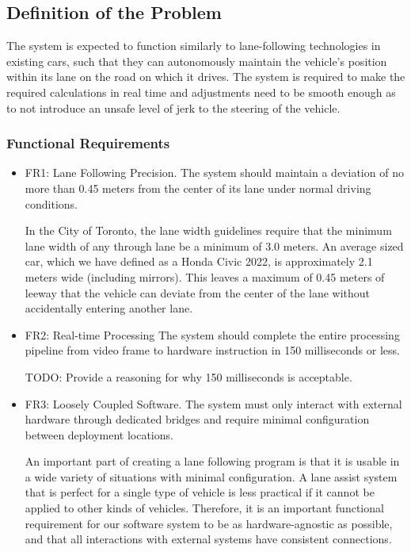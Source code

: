 \documentclass[titlepage,draft]{article}
\begin{document}
\subsection{Definition of the Problem}
The system is expected to function similarly to lane-following technologies in existing cars, such that they can autonomously maintain the vehicle’s position within its lane on the road on which it drives. The system is required to make the required calculations in real time and adjustments need to be smooth enough as to not introduce an unsafe level of jerk to the steering of the vehicle.


\subsubsection{Functional Requirements}
\begin{itemize}

	\item FR1: Lane Following Precision. The system should maintain a deviation of no more than 0.45 meters from the center of its lane under normal driving conditions.

	      In the City of Toronto, the lane width guidelines require that the minimum lane width of any through lane be a minimum
	      of 3.0 meters. \cite{LaneWidthsGuideline}
	      An average sized car, which we have defined as a Honda Civic 2022, is approximately 2.1 meters wide (including
	      mirrors). \cite{HondaCivicSpecs}
	      This leaves a maximum of 0.45 meters of leeway that the vehicle can deviate from the center of the lane without
	      accidentally entering another lane.

	\item FR2: Real-time Processing
	      The system should complete the entire processing pipeline from video frame to hardware instruction in 150 milliseconds or less.

	      TODO: Provide a reasoning for why 150 milliseconds is acceptable.


	\item FR3: Loosely Coupled Software. The system must only interact with external hardware through dedicated bridges and require minimal configuration between deployment locations.

	      An important part of creating a lane following program is that it is usable in a wide variety of situations with minimal configuration. A lane assist system that is perfect for a single type of vehicle is less practical if it cannot be applied to other kinds of vehicles. Therefore, it is an important functional requirement for our software system to be as hardware-agnostic as possible, and that all interactions with external systems have consistent connections.

\end{itemize}
\end{document}
